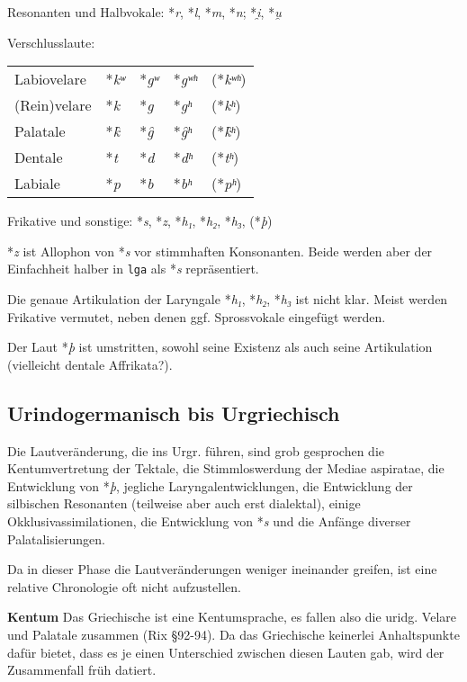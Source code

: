 \documentclass[12pt,a4paper,normalheadings]{scrartcl}
\newcounter{para}
\newcommand{\mypara}[1]{\vspace{1em}\par\noindent\refstepcounter{para}%
\textbf{\textsf{\thepara}}\enspace\textbf{#1}\quad}
\def\rek#1{\mbox{*\textit{#1}}}
\def\tt#1{\texttt{#1}}
\begin{document}
\noindent
Resonanten und Halbvokale: \rek{r}, \rek{l}, \rek{m}, \rek{n}; \rek{i̯}, \rek{u̯}

\noindent
Verschlusslaute:\\
\begin{tabular}{l l l l l}
Labiovelare & \rek{kʷ} & \rek{gʷ} & \rek{gʷʰ} & (\rek{kʷʰ})\\
(Rein)velare & \rek{k} & \rek{g} & \rek{gʰ} & (\rek{kʰ})\\
Palatale & \rek{k̑} & \rek{g̑} & \rek{g̑ʰ} & (\rek{k̑ʰ})\\
Dentale & \rek{t} & \rek{d} & \rek{dʰ} & (\rek{tʰ})\\
Labiale & \rek{p} & \rek{b} & \rek{bʰ} & (\rek{pʰ})\\
\end{tabular}

\noindent
Frikative und sonstige: \rek{s}, \rek{z}, \rek{h₁}, \rek{h₂}, \rek{h₃}, (\rek{þ})

\bigskip
\rek{z} ist Allophon von \rek{s} vor stimmhaften Konsonanten.
Beide werden aber der Einfachheit halber in \tt{lga} als \rek{s} repräsentiert.

Die genaue Artikulation der Laryngale \rek{h₁}, \rek{h₂}, \rek{h₃}
ist nicht klar. Meist werden Frikative vermutet,
neben denen ggf. Sprossvokale eingefügt werden.

Der Laut \rek{þ} ist umstritten,
sowohl seine Existenz als auch seine Artikulation
(vielleicht dentale Affrikata?).

\subsection{Urindogermanisch bis Urgriechisch}

Die Lautveränderung,
die ins Urgr. führen, sind grob gesprochen
die Kentumvertretung der Tektale,
die Stimmloswerdung der Mediae aspiratae,
die Entwicklung von \rek{þ},
jegliche Laryngalentwicklungen,
die Entwicklung der silbischen Resonanten (teilweise aber auch erst dialektal),
einige Okklusivassimilationen,
die Entwicklung von \rek{s}
und die Anfänge diverser Palatalisierungen.

Da in dieser Phase die Lautveränderungen weniger ineinander greifen,
ist eine relative Chronologie oft nicht aufzustellen.

\mypara{Kentum}
Das Griechische ist eine Kentumsprache,
es fallen also die uridg. Velare und Palatale zusammen (Rix §92-94).
Da das Griechische keinerlei Anhaltspunkte dafür bietet,
dass es je einen Unterschied zwischen diesen Lauten gab,
wird der Zusammenfall früh datiert.
\end{document}
